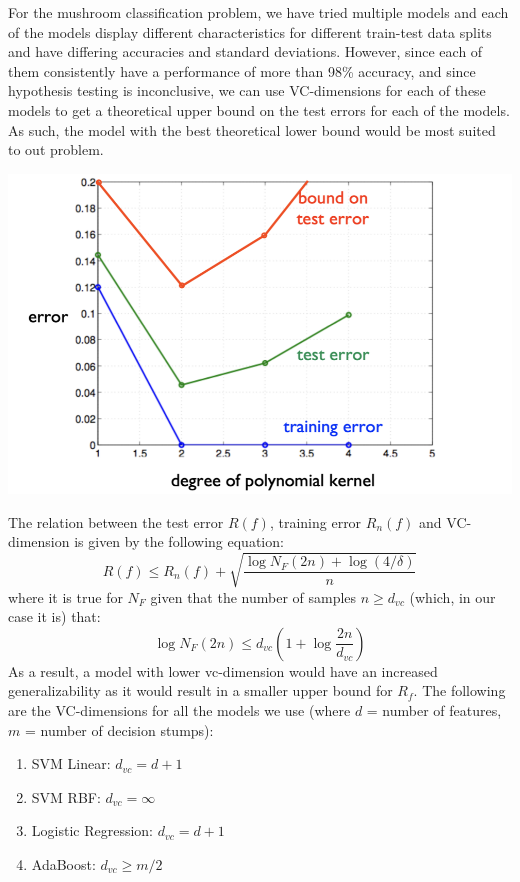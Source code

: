 \documentclass[fleqn]{article}
\begin{document}
    For the mushroom classification problem, we have tried multiple models and each of
    the models display different characteristics for different train-test data splits and have
    differing accuracies and standard deviations. However, since each of them consistently
    have a performance of more than 98\% accuracy, and since hypothesis testing is
    inconclusive, we can use VC-dimensions for each of these models to get a theoretical
    upper bound on the test errors for each of the models. As such, the model with the best
    theoretical lower bound would be most suited to out problem.\\

    \begin{center}
        \includegraphics[scale=0.75]{vc.png}
    \end{center}

    The relation between the test error $ R(f) $, training error $ R_n(f) $ and VC-dimension
    is given by the following equation:
        $$ R(f) \leq R_n(f) + \sqrt{\frac{\log N_F(2n) + \log (4/\delta)}{n}} $$
    where it is true for $ N_F $ given that the number of samples $ n \geq d_{vc}$ (which, in
    our case it is) that:
        $$ \log N_F(2n) \leq d_{vc} \left(1+\log\frac{2n}{d_{vc}}\right) $$
    As a result, a model with lower vc-dimension would have an increased generalizability
    as it would result in a smaller upper bound for $ R_f $. The following are the
    VC-dimensions for all the models we use (where $ d $ = number of features,
    $ m $ = number of decision stumps):

    \begin{multicols}{2}
        \begin{enumerate}
            \item SVM Linear: $ d_{vc} = d + 1 $
            \item SVM RBF: $ d_{vc} = \infty $
            \item Logistic Regression: $ d_{vc} = d + 1 $
            \item AdaBoost: $ d_{vc} \geq m/2 $
        \end{enumerate}
    \end{multicols}
\end{document}
